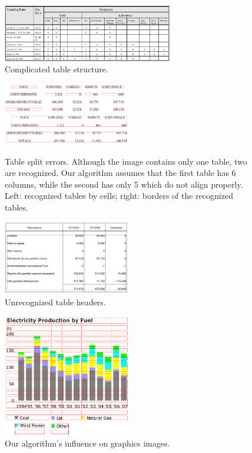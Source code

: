 \begin{figure}[t]
\centering
\includegraphics[width=20em]{img/results/errorStructure.jpg}
\caption{Complicated table structure.}
\label{fig:errorTableStructures}
\end{figure}

\begin{figure}[t]
\centering

\includegraphics[width=15em]{img/results/otherErr1Cell.png}
\qquad
\includegraphics[width=15em]{img/results/otherErr1Table.png}

\caption{Table split errors. Although the image contains only one table, two are recognized. Our algorithm assumes that the first table has 6 columns, while the second has only 5 which do not align properly.
Left: recognized tables by cells; right: borders of the recognized tables.}
\label{fig:errorsOtherSplit}
\end{figure}

\begin{figure}[t]
\centering
\includegraphics[width=15em]{img/results/otherErr2.png}
\caption{Unrecognized table headers.}
\label{fig:errorsOtherHeaders}
\end{figure}

\begin{figure}[t]
\centering
\includegraphics[width=15em]{img/results/otherErr3.png}
\caption{Our algorithm's influence on graphics images.}
\label{fig:errorsOtherGraphics}
\end{figure}

